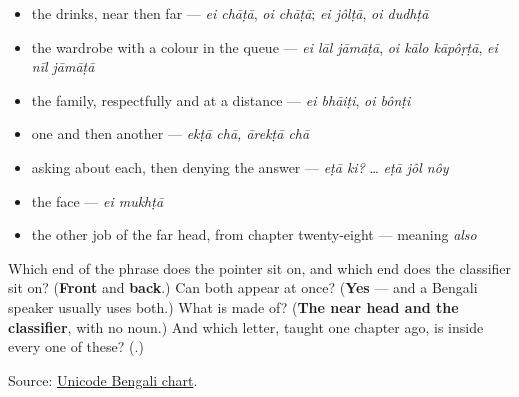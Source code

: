 \begin{itemize}
\raggedright
  \item the drinks, near then far — \emph{ei chāṭā}, \emph{oi chāṭā}; \emph{ei jôlṭā}, \emph{oi dudhṭā}
  \item the wardrobe with a colour in the queue — \emph{ei lāl jāmāṭā}, \emph{oi kālo kāpôṛṭā}, \emph{ei nīl jāmāṭā}
  \item the family, respectfully and at a distance — \emph{ei bhāiṭi}, \emph{oi bônṭi}
  \item one and then another — \emph{ekṭā chā, ārekṭā chā}
  \item asking about each, then denying the answer — \emph{eṭā ki?} … \emph{eṭā jôl nôy}
  \item the face — \emph{ei mukhṭā}
  \item the other job of the far head, from chapter twenty-eight — \textbf{} meaning \emph{also}
\end{itemize}

\begin{tcolorbox}[breakable,colback=teal!4,colframe=teal!35!black,title={Before you move on}]
Which end of the phrase does the pointer sit on, and which end does the classifier sit on? (\textbf{Front} and \textbf{back}.) Can both appear at once? (\textbf{Yes} — and a Bengali speaker usually uses both.) What is \textbf{} made of? (\textbf{The near head and the classifier}, with no noun.) And which letter, taught one chapter ago, is inside every one of these? (\textbf{}.)

Source: \href{https://www.unicode.org/charts/PDF/U0980.pdf}{Unicode Bengali chart}.
\end{tcolorbox}

